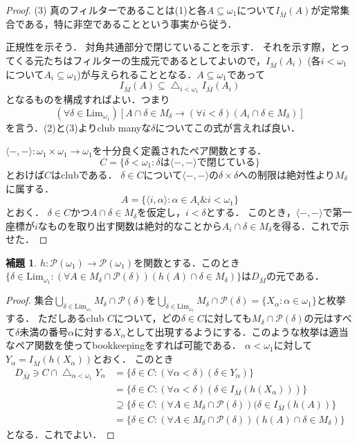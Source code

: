 \documentclass[uplatex]{jsarticle}
\newcommand{\Pow}{\mathcal{P}}
\newcommand{\AND}{\mathbin{\&}}
\newcommand{\Limone}{\mathrm{Lim}_{\omega_1}}
\DeclareMathOperator*{\diagintr}{\triangle}
\renewcommand\subset{\subseteq}
\theoremstyle{definition}
\newtheorem{lem}[thm]{補題}
\begin{document}
\begin{proof}
		(3) 真のフィルターであることは(1)と各$A \subset \omega_1$について$I_{\bar{M}}(A)$が定常集合である，特に非空であることという事実から従う．
		
		正規性を示そう．
		対角共通部分で閉じていることを示す．
		それを示す際，とってくる元たちはフィルターの生成元であるとしてよいので，$I_{\bar{M}}(A_i)$ (各$i < \omega_1$について$A_i \subset \omega_1$)が与えられることとなる．$A \subset \omega_1$であって
		\[
		I_{\bar{M}}(A) \subset \diagintr_{i < \omega_1} I_{\bar{M}}(A_i)
		\]
		となるものを構成すればよい．つまり
		\[
		(\forall \delta \in \Limone)[A \cap \delta \in M_\delta \rightarrow (\forall i < \delta)(A_i \cap \delta \in M_\delta)]
		\]
		を言う．(2)と(3)よりclub manyな$\delta$についてこの式が言えれば良い．
		
		$\langle -, -\rangle : \omega_1 \times \omega_1 \to \omega_1$を十分良く定義されたペア関数とする．
		\[
		C = \{ \delta < \omega_1 : \text{$\delta$は$\langle -, -\rangle$で閉じている}\}
		\]
		とおけば$C$はclubである．
		$\delta \in C$について$\langle -, -\rangle$の$\delta \times \delta$への制限は絶対性より$M_\delta$に属する．
		\[
		A = \{ \langle i, \alpha\rangle : \alpha \in A_i \AND i < \omega_1 \}
		\]
		とおく．
		$\delta \in C$かつ$A \cap \delta \in M_\delta$を仮定し，$i < \delta$とする．
		このとき，$\langle -, -\rangle$で第一座標が$i$なものを取り出す関数は絶対的なことから$A_i \cap \delta \in M_\delta$を得る．これで示せた．
	\end{proof}

	\begin{lem}\label{lem:closure}
		$h \colon \Pow(\omega_1) \to \Pow(\omega_1)$を関数とする．このとき$\{ \delta \in \Limone : (\forall A \in M_\delta \cap \Pow(\delta))(h(A) \cap \delta \in M_\delta) \}$は$D_{\bar{M}}$の元である．
	\end{lem}
	\begin{proof}
			集合$\bigcup_{\delta \in \Limone} M_\delta \cap \Pow(\delta)$を$\bigcup_{\delta \in \Limone} M_\delta \cap \Pow(\delta) = \{ X_\alpha : \alpha \in \omega_1 \}$と枚挙する．
			ただしあるclub $C$について，どの$\delta \in C$に対しても$M_\delta \cap \Pow(\delta)$の元はすべて$\delta$未満の番号$\alpha$に対する$X_\alpha$として出現するようにする．このような枚挙は適当なペア関数を使ってbookkeepingをすれば可能である．
			$\alpha < \omega_1$に対して$Y_\alpha = I_{\bar{M}}(h(X_\alpha))$とおく．
			このとき
			\begin{align*}
				D_{\bar{M}} \ni C \cap \diagintr_{\alpha < \omega_1} Y_\alpha &= \{ \delta \in C : (\forall \alpha < \delta)(\delta \in Y_\alpha) \} \\
			 	&= \{ \delta \in C : (\forall \alpha < \delta)(\delta \in I_{\bar{M}}(h(X_\alpha))) \} \\
			 	&\supseteq \{ \delta \in C : (\forall A \in M_\delta \cap \Pow(\delta))(\delta \in I_{\bar{M}}(h(A)) \} \\
			 	&= \{ \delta \in C : (\forall A \in M_\delta \cap \Pow(\delta))(h(A) \cap \delta \in M_\delta) \}
			\end{align*}
			となる．これでよい．
		\end{proof}
\end{document}
